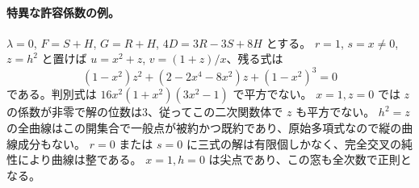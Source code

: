 \paragraph{特異な許容係数の例。}
$\lambda=0$, $F=S+H$, $G=R+H$, $4D=3R-3S+8H$ とする。
$r=1$, $s=x\ne0$, $z=h^2$ と置けば $u=x^2+z$, $v=(1+z)/x$、残る式は
\[
        (1-x^2)z^2+(2-2x^4-8x^2)z+(1-x^2)^3=0
\]
である。判別式は $16x^2(1+x^2)(3x^2-1)$ で平方でない。
$x=1,z=0$ では $z$ の係数が非零で解の位数は3、従ってこの二次関数体で $z$ も平方でない。
$h^2=z$ の全曲線はこの開集合で一般点が被約かつ既約であり、原始多項式なので縦の曲線成分もない。
$r=0$ または $s=0$ に三式の解は有限個しかなく、完全交叉の純性により曲線は整である。
$x=1,h=0$ は尖点であり、この窓も全次数で正則となる。
